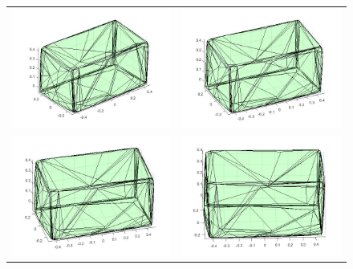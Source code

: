 \begin{figure}[ht!]
     \centering
     \begin{tabular}{cc}
        \includegraphics[width=.50\textwidth]{images/1.jpg}&
        \includegraphics[width=.50\textwidth]{images/2.jpg}\\
        \includegraphics[width=.50\textwidth]{images/3.jpg}&
        \includegraphics[width=.50\textwidth]{images/4.jpg}\\

\end{tabular}
\end{figure}
